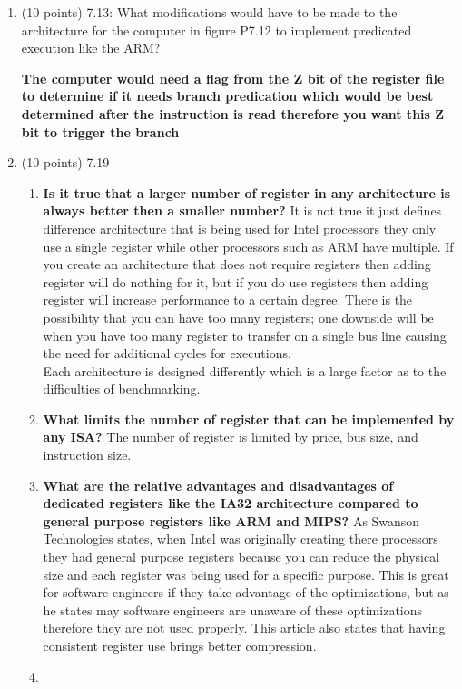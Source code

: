 \documentclass[letterpaper,10pt,onecolumn,titlepage]{article}
\begin{document}
\begin{enumerate}
\begin{mdframed}[style=MyFrame]
\end{mdframed}
\item (10 points) 7.13: What modifications would have to be made to the architecture for the computer in figure P7.12 to implement predicated execution like the ARM?
\begin{mdframed}[style=MyFrame]
\textbf{The computer would need a flag from the Z bit of the register file to determine if it needs branch predication which would be best determined after the instruction is read therefore you want this Z bit to trigger the branch  }
\end{mdframed}
\newpage
\item (10 points) 7.19
\begin{mdframed}[style=MyFrame]
\begin{enumerate}
\item \textbf{Is it true that a larger number of register in any architecture is always better then a smaller number?} It is not true it just defines difference architecture that is being used for Intel processors they only use a single register while other processors such as ARM have multiple.  If you create an architecture that does not require registers then adding register will do nothing for it, but if you do use registers then adding register will increase performance to a certain degree. There is the possibility that you can have too many registers; one downside will be when you have too many register to transfer on a single bus line causing the need for additional cycles for executions. \\ 
Each architecture is designed differently which is a large factor as to the difficulties of benchmarking. 
\item \textbf{What limits the number of register that can be implemented by any ISA? } The number of register is limited by price, bus size, and instruction size.
\item \textbf{What are the relative advantages and disadvantages of dedicated registers like the IA32 architecture compared to general purpose registers like ARM and MIPS?} As Swanson Technologies \cite{Swanson} states, when Intel was originally creating there processors they had general purpose registers because you can reduce the physical size and each register was being used for a specific purpose. This is great for software engineers if they take advantage of the optimizations, but as he states may software engineers are unaware of these optimizations therefore they are not used properly. This article also states that having consistent register use brings better compression. 
\item 
\end{enumerate}
\end{mdframed}


\end{enumerate}
\end{document}
